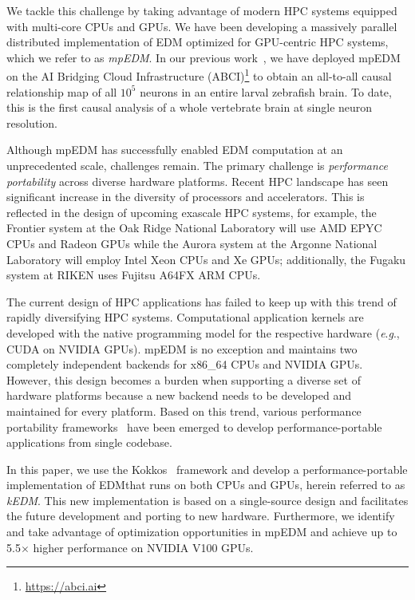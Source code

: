 \documentclass{acmart}
\begin{document}
We tackle this challenge by taking advantage of modern HPC systems equipped
with multi-core CPUs and GPUs. We have been developing a massively
parallel distributed implementation of EDM optimized for GPU-centric HPC
systems, which we refer to as \textit{mpEDM}. In our previous work~\cite{mpedm}, we have deployed mpEDM on the AI
Bridging Cloud Infrastructure (ABCI)\footnote{\url{https://abci.ai}} to
obtain an all-to-all causal relationship map of all $10^5$ neurons in an
entire larval zebrafish brain. To date, this is the first causal analysis
of a whole vertebrate brain at single neuron resolution.

Although mpEDM has successfully enabled EDM computation at an unprecedented
scale, challenges remain. The primary challenge is
\textit{performance portability} across diverse hardware platforms. Recent HPC
landscape has seen significant increase in the diversity of processors and
accelerators. This is reflected in the design of upcoming exascale HPC systems, for example, 
the Frontier system at the Oak Ridge National Laboratory will use AMD EPYC
CPUs and Radeon GPUs while the Aurora system at the Argonne National
Laboratory will employ Intel Xeon CPUs and Xe GPUs; additionally, the Fugaku system at RIKEN
uses Fujitsu A64FX ARM CPUs.

The current design of HPC applications has failed to keep up with this trend
of rapidly diversifying HPC systems. Computational application kernels are developed with the native programming model for the
respective hardware (\textit{e}.\textit{g}., CUDA on NVIDIA GPUs). mpEDM is no exception and
maintains two completely independent backends for x86\_64 CPUs and NVIDIA
GPUs. However, this design becomes a burden when supporting a diverse set of
hardware platforms because a new backend needs to be developed and maintained
for every platform. Based on this trend, various performance portability
frameworks~\cite{Deakin2019, Deakin2020} have been emerged to develop
performance-portable applications from single codebase.

In this paper, we use the Kokkos~\cite{Edwards2014} framework and develop a performance-portable implementation of EDM\@ that runs on
both CPUs and GPUs, herein referred to as \textit{kEDM}. This new implementation is based on a single-source design and
facilitates the future development and porting to new hardware. Furthermore,
we identify and take advantage of optimization opportunities in mpEDM and
achieve up to 5.5$\times$ higher performance on NVIDIA V100 GPUs.
\end{document}
